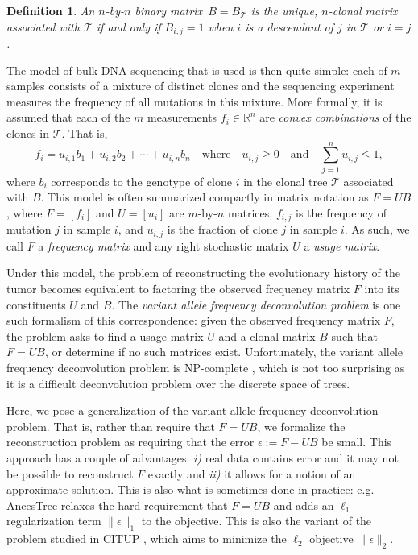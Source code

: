 \documentclass[10pt]{article}
\newtheorem{definition}{Definition}
\newcommand{\tree}{\mathcal{T}}
\begin{document}
\begin{definition}
    An $n$-by-$n$ binary matrix $\,B = B_{\tree}$ is the unique, $n$-clonal matrix associated with $\tree$ 
  if and only if $B_{i, j} = 1$ when $i$ is a descendant of $j$ in $\tree$ or 
  $i = j$.
\end{definition}

The model of bulk DNA sequencing that is used is then quite simple: each of $m$ samples 
consists of a mixture of distinct clones and the sequencing experiment measures the 
frequency of all mutations in this mixture. More formally, it is assumed that 
each of the $m$ measurements $f_i \in \mathbb{R}^n$ are \emph{convex combinations} of the clones
in $\tree$. That is,
\[f_i = u_{i,1}b_1 + u_{i,2}b_2 + \cdots + u_{i,n}b_n \quad\text{where}\quad u_{i, j} \geq 0 \quad\text{and}\quad \sum_{j=1}^nu_{i, j} \leq 1,\]
where $b_i$ corresponds to the genotype of clone $i$ in the clonal tree $\tree$ associated with $B$.
This model is often summarized compactly in matrix notation as $F = UB$, where $F = [f_i]$ and $U = [u_i]$ are $m$-by-$n$ matrices, 
$f_{i,j}$ is the frequency of mutation $j$ in sample $i$, and $u_{i,j}$ is the fraction of clone $j$ in sample $i$. As such, we
call $F$ a \emph{frequency matrix} and any right stochastic matrix $U$ a \emph{usage matrix}.

Under this model, the problem of reconstructing the evolutionary history of the tumor
becomes equivalent to factoring the observed frequency matrix $F$ into its constituents $U$ and $B$.
The \emph{variant allele frequency deconvolution problem} \cite{el-kebir_reconstruction_2015}
is one such formalism of this correspondence: given the observed frequency matrix $F$, 
the problem asks to find a usage matrix $U$ and a clonal matrix $B$ such that $F = UB$, or determine
if no such matrices exist. Unfortunately, the variant allele frequency deconvolution problem is 
NP-complete \cite{el-kebir_reconstruction_2015}, which is not too surprising as it is a difficult 
deconvolution problem over the discrete space of trees.

Here, we pose a generalization of the variant allele frequency deconvolution problem.
That is, rather than require that $F = UB$, we formalize the reconstruction problem as
requiring that the error $\epsilon := F - UB$ be small. This approach has
a couple of advantages: \textit{i)} real data contains error and it may not be possible to reconstruct
$F$ exactly and \textit{ii)} it allows for a notion of an approximate solution. This is also what is sometimes done in practice: 
e.g. AncesTree \cite{el-kebir_reconstruction_2015} relaxes the hard requirement that $F = UB$ and 
adds an $\ell_1$ regularization term $\lVert \epsilon \rVert_1$ to the objective.  
This is also the variant of the problem studied in CITUP \cite{malikic_clonality_2015}, which aims to 
minimize the $\ell_2$ objective $\lVert \epsilon \rVert_2$. 
\end{document}
